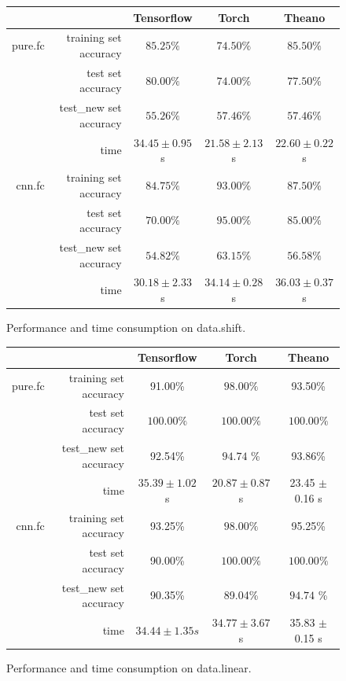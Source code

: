 \documentclass[a4paper]{article}
\begin{document}
\begin{figure}[H]
\centering
\begin{tabular}{|r|r|c|c|c|}
\hline
 & & Tensorflow & Torch & Theano \\
\hline
pure.fc & training set accuracy & $85.25\%$ & $74.50\%$ & $\bm{85.50}\%$ \\
 & test set accuracy & $\bm{80.00}\%$ & $74.00\%$ & $77.50\%$ \\
 & test\_new set accuracy & $55.26\%$ & $\bm{57.46}\%$ & $\bm{57.46}\%$ \\
 & time & $34.45\pm0.95$s & $\bm{21.58\pm2.13}$s & $22.60\pm0.22$s \\
\hline
cnn.fc & training set accuracy & $84.75\%$ & $\bm{93.00}\%$ & $87.50\%$ \\
 & test set accuracy & $70.00\%$ & $\bm{95.00}\%$ & $85.00\%$ \\
 & test\_new set accuracy & $54.82\%$ & $\bm{63.15}\%$ & $56.58\%$ \\
 & time & $\bm{30.18\pm2.33}$s & $34.14\pm0.28$s & $36.03\pm0.37$s \\
\hline
\end{tabular}
\caption{Performance and time consumption on data.shift.}
\end{figure}

\begin{figure}[H]
\centering
\begin{tabular}{|r|r|c|c|c|}
\hline
 & & Tensorflow & Torch & Theano \\
\hline
pure.fc & training set accuracy & 91.00\% & $\bm{98.00\%}$ & 93.50\% \\
 & test set accuracy & $\bm{100.00\%}$ & $\bm{100.00\%}$ & $\bm{100.00\%}$ \\
 & test\_new set accuracy & 92.54\% & $\bm{94.74}$ \% & 93.86\%\\
 & time & $35.39 \pm 1.02$ s & $\bm{20.87 \pm 0.87}$ s & 23.45 $\pm$ 0.16 s \\
\hline
cnn.fc & training set accuracy & 93.25\% & $\bm{98.00\%}$ & 95.25\% \\
 & test set accuracy & 90.00\% & $\bm{100.00\%}$ & $\bm{100.00\%}$ \\
 & test\_new set accuracy & 90.35\% & 89.04\% & $\bm{94.74}$ \% \\
 & time & $\bm{34.44 \pm 1.35} s$ & $34.77 \pm 3.67$s & 35.83 $\pm$ 0.15 s\\
\hline
\end{tabular}
\caption{Performance and time consumption on data.linear.}
\end{figure}
\end{document}

